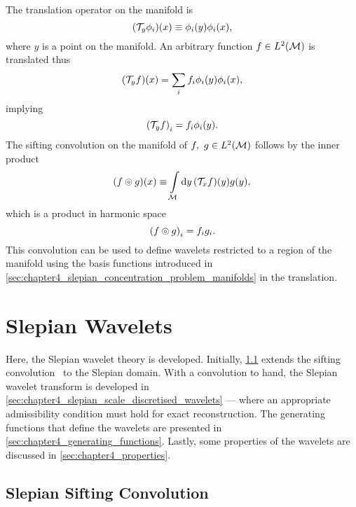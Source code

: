 The translation operator on the manifold is
%
\begin{equation}
	(\mathcal{T}_{y}\phi_{i})(x)
	\equiv \phi_{i}(y) \phi_{i}(x),
\end{equation}
%
where \(y\) is a point on the manifold.
An arbitrary function \(f \in L^{2}(\mathcal{M})\) is translated thus
%
\begin{equation}
	(\mathcal{T}_{y}f)(x)
	= \sum\limits_{i} f_{i} \phi_{i}(y) \phi_{i}(x),
\end{equation}
%
implying
%
\begin{equation}
	{(\mathcal{T}_{y}f)}_{i}
	= f_{i} \phi_{i}(y).
\end{equation}
%
The sifting convolution on the manifold of \(f,\ g \in L^{2}(\mathcal{M})\) follows by the inner product
%
\begin{equation}
	(f \circledcirc{} g)(x)
	\equiv \int\limits_{\mathcal{M}} \dd{y} (\mathcal{T}_{x}f)(y) g(y),
\end{equation}
%
which is a product in harmonic space
%
\begin{equation}
	{(f \circledcirc{} g)}_{i}
	= f_{i} g_{i}.
\end{equation}
%
This convolution can be used to define wavelets restricted to a region of the manifold using the basis functions introduced in \cref{sec:chapter4_slepian_concentration_problem_manifolds} in the translation.

\section{Slepian Wavelets}\label{sec:chapter4_slepian_wavelets}

Here, the Slepian wavelet theory is developed.
Initially, \cref{sec:chapter4_slepian_sifting_convolution} extends the sifting convolution~\cite{Roddy2021} to the Slepian domain.
With a convolution to hand, the Slepian wavelet transform is developed in \cref{sec:chapter4_slepian_scale_discretised_wavelets} --- where an appropriate admissibility condition must hold for exact reconstruction.
The generating functions that define the wavelets are presented in \cref{sec:chapter4_generating_functions}.
Lastly, some properties of the wavelets are discussed in \cref{sec:chapter4_properties}.

\subsection{Slepian Sifting Convolution}\label{sec:chapter4_slepian_sifting_convolution}

